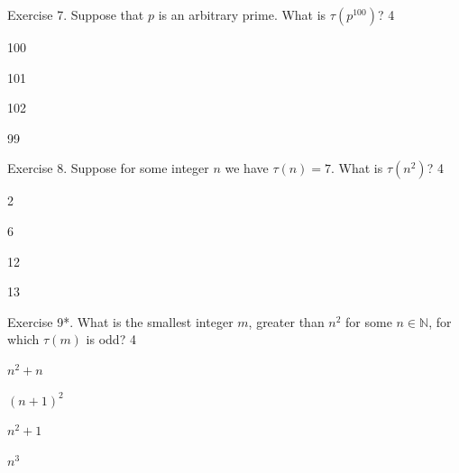 \documentclass[../../book.tex]{subfiles}
\begin{document}
\begin{xexercise}
    {Exercise 7.}
    {Suppose that $p$ is an arbitrary prime. What is $\tau(p^{100})$? }
    {4}
    {
        \item 100
        \item 101
        \item 102
        \item 99
    }    
\end{xexercise}

\begin{xexercise}
    {Exercise 8.}
    {Suppose for some integer $n$ we have $\tau(n)=7$. What is $\tau(n^2)$?}
    {4}
    {
        \item 2
        \item 6
        \item 12
        \item 13
    }    
\end{xexercise}

\begin{xexercise}
    {Exercise 9*.}
    {What is the smallest integer $m$, greater than $n^2$ for some $n \in \mathbb{N}$, for which $\tau(m)$ is odd?}
    {4}
    {
        \item $n^2+n$
        \item $(n+1)^2$
        \item $n^2+1$
        \item $n^3$
    }    
\end{xexercise}
\end{document}
